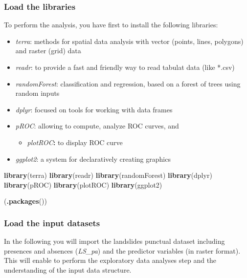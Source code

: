 \documentclass[
]{article}
\newenvironment{Shaded}{\begin{snugshade}}{\end{snugshade}}
\newcommand{\FunctionTok}[1]{\textcolor[rgb]{0.13,0.29,0.53}{\textbf{#1}}}
\newcommand{\NormalTok}[1]{#1}
\providecommand{\tightlist}{%
  \setlength{\itemsep}{0pt}\setlength{\parskip}{0pt}}
\begin{document}
\subsubsection{Load the libraries}\label{load-the-libraries-2}

To perform the analysis, you have first to install the following libraries:

\begin{itemize}
\tightlist
\item
  \emph{terra}: methods for spatial data analysis with vector (points, lines, polygons) and raster (grid) data
\item
  \emph{readr}: to provide a fast and friendly way to read tabulat data (like *.csv)
\item
  \emph{randomForest}: classification and regression, based on a forest of trees using random inputs
\item
  \emph{dplyr}: focused on tools for working with data frames
\item
  \emph{pROC}: allowing to compute, analyze ROC curves, and

  \begin{itemize}
  \tightlist
  \item
    \emph{plotROC}\textbf{:} to display ROC curve
  \end{itemize}
\item
  \emph{ggplot2}: a system for declaratively creating graphics
\end{itemize}

\begin{Shaded}
\begin{Highlighting}[]
\FunctionTok{library}\NormalTok{(terra)}
\FunctionTok{library}\NormalTok{(readr) }
\FunctionTok{library}\NormalTok{(randomForest) }
\FunctionTok{library}\NormalTok{(dplyr) }
\FunctionTok{library}\NormalTok{(pROC) }
\FunctionTok{library}\NormalTok{(plotROC) }
\FunctionTok{library}\NormalTok{(ggplot2) }

\NormalTok{(}\FunctionTok{.packages}\NormalTok{())}
\end{Highlighting}
\end{Shaded}

\subsubsection{Load the input datasets}\label{load-the-input-datasets}

In the following you will import the landslides punctual dataset including presences and absences (\emph{LS\_pa}) and the predictor variables (in raster format).
This will enable to perform the exploratory data analyses step and the understanding of the input data structure.
\end{document}
